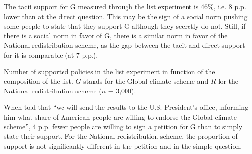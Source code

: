 \documentclass{nature}
\begin{document}
The tacit support for G measured through the list experiment is 46\%, i.e. 8 p.p. lower than at the direct question. This may be the sign of a social norm pushing some people to state that they support G although they secretly do not. Still, if there is a social norm in favor of G, there is a similar norm in favor of the National redistribution scheme, as the gap between the tacit and direct support for it is comparable (at 7 p.p.). %

\begin{table}\label{tab:list_exp}
  \caption{Number of supported policies in the list experiment in function of the composition of the list. $G$ stands for the Global climate scheme and $R$ for the National redistribution scheme ($n$ = 3,000).} %

\end{table}

When told that ``we will send the results to the U.S. President's office, informing him what share of American people are willing to endorse the Global climate scheme'', 4 p.p. fewer people are willing to sign a petition for G than to simply state their support. For the National redistribution scheme, the proportion of support is not significantly different in the petition and in the simple question. 
\end{document}
